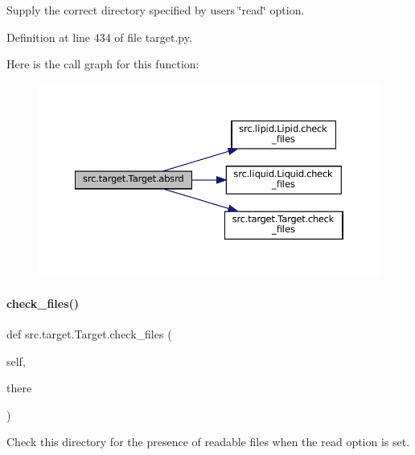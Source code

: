 Supply the correct directory specified by user\textquotesingle{}s \char`\"{}read\char`\"{} option. 



Definition at line 434 of file target.\+py.

Here is the call graph for this function\+:
\nopagebreak
\begin{figure}[H]
\begin{center}
\leavevmode
\includegraphics[width=350pt]{classsrc_1_1target_1_1Target_ad4a6e0bee35444a8b2c8bc124aac3c46_cgraph}
\end{center}
\end{figure}
\mbox{\label{classsrc_1_1target_1_1Target_ab38c76271f96279624e9981bc365a082}} 
\paragraph{\texorpdfstring{check\+\_\+files()}{check\_files()}}
{\footnotesize\ttfamily def src.\+target.\+Target.\+check\+\_\+files (\begin{DoxyParamCaption}\item[{}]{self,  }\item[{}]{there }\end{DoxyParamCaption})\hspace{0.3cm}{\ttfamily [inherited]}}



Check this directory for the presence of readable files when the \textquotesingle{}read\textquotesingle{} option is set. 



